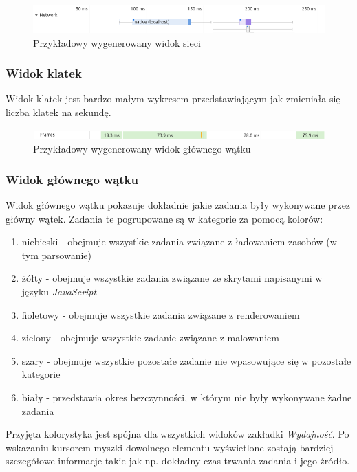 \documentclass[polish, twoside, 12pt]{mwart}
\begin{document}
\begin{figure}[ht]
  \includegraphics[width=\textwidth]{chrome-devtools-performance-network-view.png}
	\caption{Przykładowy wygenerowany widok sieci}
\end{figure}

\subsubsection{Widok klatek}

Widok klatek jest bardzo małym wykresem przedstawiającym jak zmieniała się liczba klatek na sekundę.

\begin{figure}[ht]
  \includegraphics[width=\textwidth]{chrome-devtools-performance-frames-view.png}
	\caption{Przykładowy wygenerowany widok głównego wątku}
\end{figure}

\subsubsection{Widok głównego wątku}

Widok głównego wątku pokazuje dokładnie jakie zadania były wykonywane przez główny wątek. Zadania te pogrupowane są w kategorie za pomocą kolorów:

\begin{enumerate}
  \item niebieski - obejmuje wszystkie zadania związane z ładowaniem zasobów (w tym parsowanie)
  \item żółty - obejmuje wszystkie zadania związane ze skrytami napisanymi w języku \emph{JavaScript}
  \item fioletowy - obejmuje wszystkie zadania związane z renderowaniem
  \item zielony - obejmuje wszystkie zadanie związane z malowaniem
  \item szary - obejmuje wszystkie pozostałe zadanie nie wpasowujące się w pozostałe kategorie
  \item biały - przedstawia okres bezczynności, w którym nie były wykonywane żadne zadania
\end{enumerate}

Przyjęta kolorystyka jest spójna dla wszystkich widoków zakładki \emph{Wydajność}. Po wskazaniu kursorem myszki dowolnego elementu wyświetlone zostają bardziej szczegółowe informacje takie jak np. dokładny czas trwania zadania i jego źródło.
\end{document}
